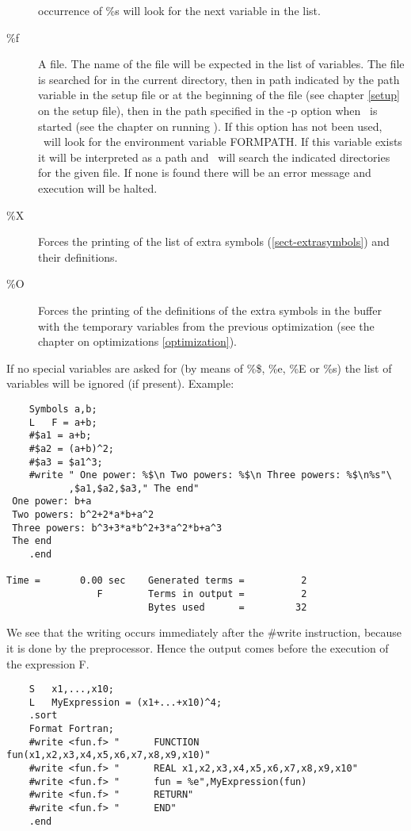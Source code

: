 \begin{description}
occurrence of \%s will look for the next variable in the list.
\item[\%f] A file. The name of the file will be expected in the 
list of variables. The file is searched for in the current directory, then 
in path indicated by the path variable in the setup file or at the 
beginning of the file (see chapter \ref{setup} on the setup file), then in 
the path specified in the -p option when \FORM\ is started (see the chapter 
on running \FORM). If this option has not been used, \FORM\ will look for the 
environment variable FORMPATH. If this variable exists it 
will be interpreted as a path and \FORM\ will search the indicated 
directories for the given file. If none is found there will be an error 
message and execution will be halted.
\item[\%X] Forces the printing of the list of extra symbols 
(\ref{sect-extrasymbols}) and their definitions.
\item[\%O] Forces the printing of the definitions of the extra symbols in 
the buffer with the temporary variables from the previous optimization (see 
the chapter on optimizations \ref{optimization}). 
\end{description}
If no special variables are asked for (by means of \%\$, \%e, \%E or \%s) 
the list of variables will be ignored (if present). Example:
\begin{verbatim}
    Symbols a,b;
    L   F = a+b;
    #$a1 = a+b;
    #$a2 = (a+b)^2;
    #$a3 = $a1^3;
    #write " One power: %$\n Two powers: %$\n Three powers: %$\n%s"\
           ,$a1,$a2,$a3," The end"
 One power: b+a
 Two powers: b^2+2*a*b+a^2
 Three powers: b^3+3*a*b^2+3*a^2*b+a^3
 The end
    .end

Time =       0.00 sec    Generated terms =          2
                F        Terms in output =          2
                         Bytes used      =         32
\end{verbatim}
We see that the writing occurs immediately after the \#write 
instruction, because it is done by the preprocessor. Hence the output comes 
before the execution of the expression F.
\begin{verbatim}
    S   x1,...,x10;
    L   MyExpression = (x1+...+x10)^4;
    .sort
    Format Fortran;
    #write <fun.f> "      FUNCTION fun(x1,x2,x3,x4,x5,x6,x7,x8,x9,x10)"
    #write <fun.f> "      REAL x1,x2,x3,x4,x5,x6,x7,x8,x9,x10"
    #write <fun.f> "      fun = %e",MyExpression(fun)
    #write <fun.f> "      RETURN"
    #write <fun.f> "      END"
    .end
\end{verbatim}
